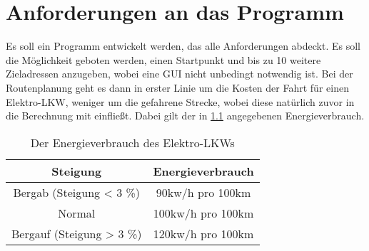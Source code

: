 \chapter{Anforderungen an das Programm}
\label{ch:anforderungen}

Es soll ein Programm entwickelt werden, das alle Anforderungen abdeckt. Es soll die Möglichkeit geboten werden, einen Startpunkt und bis zu 10 weitere Zieladressen anzugeben, wobei eine \acs{GUI} nicht unbedingt notwendig ist. Bei der Routenplanung geht es dann in erster Linie um die Kosten der Fahrt für einen Elektro-LKW, weniger um die gefahrene Strecke, wobei diese natürlich zuvor in die Berechnung mit einfließt. Dabei gilt der in \cref{tab:energieverbrauch} angegebenen Energieverbrauch.

\begin{table}[H]
	\caption{Der Energieverbrauch des Elektro-LKWs
		\label{tab:energieverbrauch}}
	\begin{center}
		\begin{tabular}{c|c}
			Steigung & Energieverbrauch \\ \hline
			Bergab (Steigung < 3 \%) & 90kw/h pro 100km \\ \hline
			Normal & 100kw/h pro 100km \\ \hline
			Bergauf (Steigung > 3 \%) & 120kw/h pro 100km \\
		\end{tabular}
	\end{center}
\end{table}
